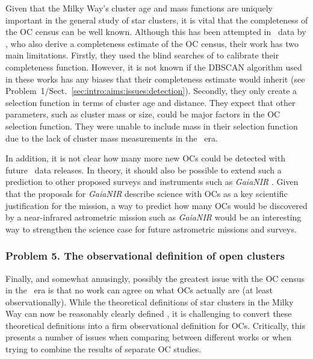 Given that the Milky Way's cluster age and mass functions are uniquely important in the general study of star clusters, it is vital that the completeness of the OC census can be well known. Although this has been attempted in \gaia\ data by \cite{anders_milky_2020}, who also derive a completeness estimate of the OC census, their work has two main limitations. Firstly, they used the blind searches of \cite{castro-ginard_new_2018,castro-ginard_hunting_2019,castro-ginard_hunting_2020} to calibrate their completeness function. However, it is not known if the DBSCAN algorithm used in these works has any biases that their completeness estimate would inherit (see Problem~1/Sect.~\ref{sec:intro:aims:issues:detection}). Secondly, they only create a selection function in terms of cluster age and distance. They expect that other parameters, such as cluster mass or size, could be major factors in the OC selection function. They were unable to include mass in their selection function due to the lack of cluster mass measurements in the \gaia\ era.

In addition, it is not clear how many more new OCs could be detected with future \gaia\ data releases. In theory, it should also be possible to extend such a prediction to other proposed surveys and instruments such as \emph{GaiaNIR} \citep{hobbs_gaianir_combining_2016}. Given that the proposals for \emph{GaiaNIR} describe science with OCs as a key scientific justification for the mission, a way to predict how many OCs would be discovered by a near-infrared astrometric mission such as \emph{GaiaNIR} would be an interesting way to strengthen the science case for future astrometric missions and surveys.


\subsubsection{Problem 5. The observational definition of open clusters}
\label{sec:intro:aims:issues:definition}

Finally, and somewhat amusingly, possibly the greatest issue with the OC census in the \gaia\ era is that no work can agree on what OCs actually are (at least observationally). While the theoretical definitions of star clusters in the Milky Way can now be reasonably clearly defined \citep[Sect.~\ref{sec:intro:definition}][]{portegies_zwart_young_2010}, it is challenging to convert these theoretical definitions into a firm observational definition for OCs. Critically, this presents a number of issues when comparing between different works or when trying to combine the results of separate OC studies.

